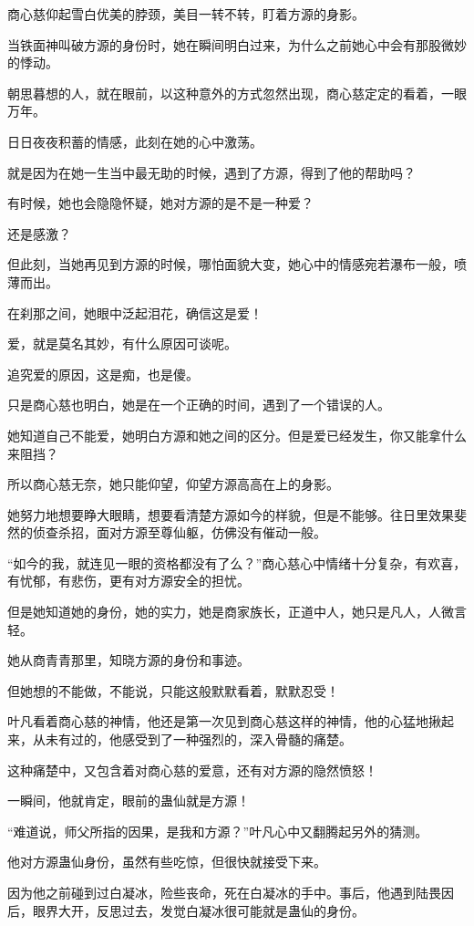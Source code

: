 \begin{this_body}
商心慈仰起雪白优美的脖颈，美目一转不转，盯着方源的身影。

当铁面神叫破方源的身份时，她在瞬间明白过来，为什么之前她心中会有那股微妙的悸动。

朝思暮想的人，就在眼前，以这种意外的方式忽然出现，商心慈定定的看着，一眼万年。

日日夜夜积蓄的情感，此刻在她的心中激荡。

就是因为在她一生当中最无助的时候，遇到了方源，得到了他的帮助吗？

有时候，她也会隐隐怀疑，她对方源的是不是一种爱？

还是感激？

但此刻，当她再见到方源的时候，哪怕面貌大变，她心中的情感宛若瀑布一般，喷薄而出。

在刹那之间，她眼中泛起泪花，确信这是爱！

爱，就是莫名其妙，有什么原因可谈呢。

追究爱的原因，这是痴，也是傻。

只是商心慈也明白，她是在一个正确的时间，遇到了一个错误的人。

她知道自己不能爱，她明白方源和她之间的区分。但是爱已经发生，你又能拿什么来阻挡？

所以商心慈无奈，她只能仰望，仰望方源高高在上的身影。

她努力地想要睁大眼睛，想要看清楚方源如今的样貌，但是不能够。往日里效果斐然的侦查杀招，面对方源至尊仙躯，仿佛没有催动一般。

“如今的我，就连见一眼的资格都没有了么？”商心慈心中情绪十分复杂，有欢喜，有忧郁，有悲伤，更有对方源安全的担忧。

但是她知道她的身份，她的实力，她是商家族长，正道中人，她只是凡人，人微言轻。

她从商青青那里，知晓方源的身份和事迹。

但她想的不能做，不能说，只能这般默默看着，默默忍受！

叶凡看着商心慈的神情，他还是第一次见到商心慈这样的神情，他的心猛地揪起来，从未有过的，他感受到了一种强烈的，深入骨髓的痛楚。

这种痛楚中，又包含着对商心慈的爱意，还有对方源的隐然愤怒！

一瞬间，他就肯定，眼前的蛊仙就是方源！

“难道说，师父所指的因果，是我和方源？”叶凡心中又翻腾起另外的猜测。

他对方源蛊仙身份，虽然有些吃惊，但很快就接受下来。

因为他之前碰到过白凝冰，险些丧命，死在白凝冰的手中。事后，他遇到陆畏因后，眼界大开，反思过去，发觉白凝冰很可能就是蛊仙的身份。


\end{this_body}
